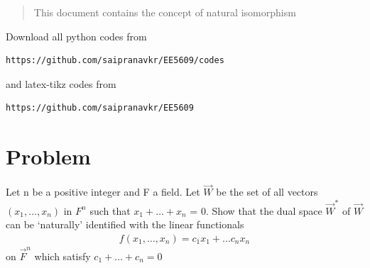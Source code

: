 \documentclass[journal,12pt,twocolumn]{IEEEtran}
\begin{document}
%
\vspace{2ex}
\begin{center}
\end{center}
\begin{abstract}
This document contains the concept of natural isomorphism
\end{abstract}
Download all python codes from 
%
\begin{lstlisting}
https://github.com/saipranavkr/EE5609/codes
\end{lstlisting}
%
and latex-tikz codes from 
%
\begin{lstlisting}
https://github.com/saipranavkr/EE5609
\end{lstlisting}
%
\section{Problem}
Let n be a positive integer and F a field. Let $\vec{W}$ be the set of all vectors $(x_1, \hdots , x_n)$ in $F^n$ such that $x_1+ \hdots+x_n$ = 0. Show that the dual space $\vec{W}^*$ of $\vec{W}$ can be ‘naturally’ identified with the linear functionals
\begin{align}
    f(x_1, \hdots , x_n) = c_1x_1 + \hdots c_nx_n \nonumber
\end{align}
on $\vec{F}^n$ which satisfy $c_1 + \hdots + c_n = 0$
%
%
\end{document}
